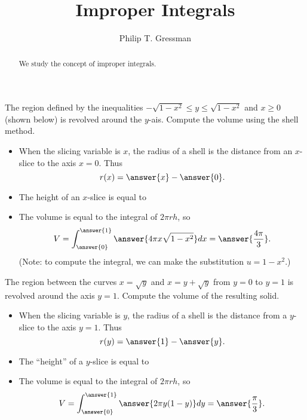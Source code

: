 \documentclass{ximera}
\title{Improper Integrals}
\author{Philip T. Gressman}
\begin{document}
\begin{abstract}
We study the concept of improper integrals.
\end{abstract}
\maketitle

\begin{example}
The region defined by the inequalities $-\sqrt{1-x^2} \leq y \leq \sqrt{1-x^2}$ and $x \geq 0$ (shown below) is revolved around the $y$-ais. Compute the volume using the shell method.
\begin{itemize}
\item When the slicing variable is $x$, the radius of a shell is the  distance from an $x$-slice to the axis $x = 0$. Thus
\[ r(x) = \answer{x} - \answer{0}. \]
\item The height of an $x$-slice is equal to
\begin{multipleChoice}
\end{multipleChoice}
\item The volume is equal to the integral of $2 \pi r h$, so 
\[ V = \int_{\answer{0}}^{\answer{1}} \answer{4 \pi x \sqrt{1-x^2}} dx = \answer{\frac{4\pi}{3}}. \]
(Note: to compute the integral, we can make the substitution $u = 1-x^2$.)
\end{itemize}
\end{example}

\begin{example}
The region between the curves $x = \sqrt{y}$ and $x = y + \sqrt{y}$ from $y=0$ to $y=1$ is revolved around the axis $y=1$. Compute the volume of the resulting solid.
\begin{itemize}
\item When the slicing variable is $y$, the radius of a shell is the  distance from a $y$-slice to the axis $y = 1$. Thus
\[ r(y) = \answer{1} - \answer{y}. \]
\item The ``height'' of a $y$-slice is equal to
\begin{multipleChoice}
\end{multipleChoice}
\item The volume is equal to the integral of $2 \pi r h$, so 
\[ V = \int_{\answer{0}}^{\answer{1}} \answer{2 \pi y(1-y)} dy = \answer{\frac{\pi}{3}}. \]
\end{itemize}
\end{example}
\end{document}
